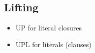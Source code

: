 \documentclass[%
handout,
]{beamer}
\begin{document}
\subsection{Lifting}
\begin{frame}
    \begin{itemize}
        \item UP for literal closures
        \vspace{-1.4em}
            
            \vspace{-2.1em}
            

        \vspace{0.7em}

    \item UPL for literals (clauses)
    \vspace{-1.4em}
    
    \vspace{-2.1em}
    
\end{itemize}


\end{frame}


\end{document}
